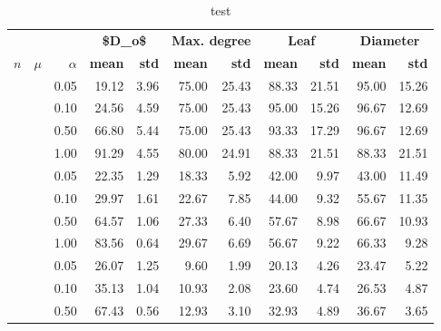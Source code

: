 \begin{table}

\caption{\label{tab:}test}
\centering
\begin{tabular}[t]{rrrrrrrrrrr}
\toprule
\multicolumn{1}{c}{\textbf{ }} & \multicolumn{1}{c}{\textbf{ }} & \multicolumn{1}{c}{\textbf{ }} & \multicolumn{2}{c}{\textbf{\$D\_o\$}} & \multicolumn{2}{c}{\textbf{Max. degree}} & \multicolumn{2}{c}{\textbf{Leaf}} & \multicolumn{2}{c}{\textbf{Diameter}} \\
\cmidrule(l{3pt}r{3pt}){4-5} \cmidrule(l{3pt}r{3pt}){6-7} \cmidrule(l{3pt}r{3pt}){8-9} \cmidrule(l{3pt}r{3pt}){10-11}
$n$ & $\mu$ & $\alpha$ & \textbf{mean} & \textbf{std} & \textbf{mean} & \textbf{std} & \textbf{mean} & \textbf{std} & \textbf{mean} & \textbf{std}\\
\midrule
 &  & 0.05 & 19.12 & 3.96 & 75.00 & 25.43 & 88.33 & 21.51 & 95.00 & 15.26\\

 &  & 0.10 & 24.56 & 4.59 & 75.00 & 25.43 & 95.00 & 15.26 & 96.67 & 12.69\\

 &  & 0.50 & 66.80 & 5.44 & 75.00 & 25.43 & 93.33 & 17.29 & 96.67 & 12.69\\

 & \multirow{-4}{*}{\raggedleft\arraybackslash 2} & 1.00 & 91.29 & 4.55 & 80.00 & 24.91 & 88.33 & 21.51 & 88.33 & 21.51\\

\cline{2-11}
 &  & 0.05 & 22.35 & 1.29 & 18.33 & 5.92 & 42.00 & 9.97 & 43.00 & 11.49\\

 &  & 0.10 & 29.97 & 1.61 & 22.67 & 7.85 & 44.00 & 9.32 & 55.67 & 11.35\\

 &  & 0.50 & 64.57 & 1.06 & 27.33 & 6.40 & 57.67 & 8.98 & 66.67 & 10.93\\

 & \multirow{-4}{*}{\raggedleft\arraybackslash 10} & 1.00 & 83.56 & 0.64 & 29.67 & 6.69 & 56.67 & 9.22 & 66.33 & 9.28\\

\cline{2-11}
 &  & 0.05 & 26.07 & 1.25 & 9.60 & 1.99 & 20.13 & 4.26 & 23.47 & 5.22\\

 &  & 0.10 & 35.13 & 1.04 & 10.93 & 2.08 & 23.60 & 4.74 & 26.53 & 4.87\\

 &  & 0.50 & 67.43 & 0.56 & 12.93 & 3.10 & 32.93 & 4.89 & 36.67 & 3.65\\


\end{tabular}
\end{table}
